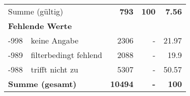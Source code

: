 \begin{longtable}{lXrrr}
     \midrule
     \multicolumn{2}{l}{Summe (gültig)} &
       \textbf{\num{793}} &
     \textbf{\num{100}} &
       \textbf{\num[round-mode=places,round-precision=2]{7.56}} \\
     \multicolumn{5}{l}{\textbf{Fehlende Werte}}\\
       -998 &
       keine Angabe &
         \num{2306} &
        - &
         \num[round-mode=places,round-precision=2]{21.97} \\
       -989 &
       filterbedingt fehlend &
         \num{2088} &
        - &
         \num[round-mode=places,round-precision=2]{19.9} \\
       -988 &
       trifft nicht zu &
         \num{5307} &
        - &
         \num[round-mode=places,round-precision=2]{50.57} \\
     \midrule
     \multicolumn{2}{l}{\textbf{Summe (gesamt)}} &
          \textbf{\num{10494}} &
        \textbf{-} &
        \textbf{\num{100}} \\
     \bottomrule
     \end{longtable}
     
